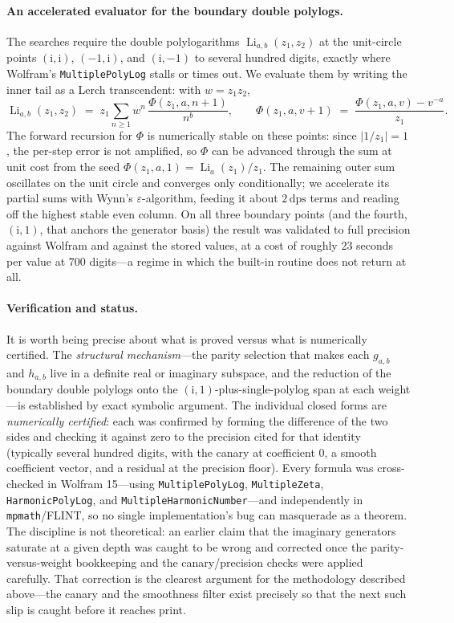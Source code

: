 \documentclass[11pt]{article}
\DeclareMathOperator{\Li}{Li}
\newcommand{\iu}{\mathrm{i}}
\theoremstyle{plain}
\theoremstyle{remark}
\begin{document}
\paragraph{An accelerated evaluator for the boundary double polylogs.}
The searches require the double polylogarithms $\Li_{a,b}(z_1,z_2)$ at the unit-circle points $(\iu,\iu)$, $(-1,\iu)$, and $(\iu,-1)$ to several hundred digits, exactly where Wolfram's \texttt{MultiplePolyLog} stalls or times out. We evaluate them by writing the inner tail as a Lerch transcendent: with $w=z_1 z_2$,
\[
  \Li_{a,b}(z_1,z_2) \;=\; z_1 \sum_{n\ge 1} w^{n}\,\frac{\Phi(z_1,a,n+1)}{n^{b}},
\qquad
  \Phi(z_1,a,v+1) \;=\; \frac{\Phi(z_1,a,v) - v^{-a}}{z_1}.
\]
The forward recursion for $\Phi$ is numerically stable on these points: since $|1/z_1| = 1$, the per-step error is not amplified, so $\Phi$ can be advanced through the sum at unit cost from the seed $\Phi(z_1,a,1)=\Li_a(z_1)/z_1$. The remaining outer sum oscillates on the unit circle and converges only conditionally; we accelerate its partial sums with Wynn's $\varepsilon$-algorithm, feeding it about $2\,\text{dps}$ terms and reading off the highest stable even column. On all three boundary points (and the fourth, $(\iu,1)$, that anchors the generator basis) the result was validated to full precision against Wolfram and against the stored values, at a cost of roughly $23$ seconds per value at $700$ digits---a regime in which the built-in routine does not return at all.

\paragraph{Verification and status.}
It is worth being precise about what is proved versus what is numerically certified. The \emph{structural mechanism}---the parity selection that makes each $g_{a,b}$ and $h_{a,b}$ live in a definite real or imaginary subspace, and the reduction of the boundary double polylogs onto the $(\iu,1)$-plus-single-polylog span at each weight---is established by exact symbolic argument. The individual closed forms are \emph{numerically certified}: each was confirmed by forming the difference of the two sides and checking it against zero to the precision cited for that identity (typically several hundred digits, with the canary at coefficient $0$, a smooth coefficient vector, and a residual at the precision floor). Every formula was cross-checked in Wolfram 15---using \texttt{MultiplePolyLog}, \texttt{MultipleZeta}, \texttt{HarmonicPolyLog}, and \texttt{MultipleHarmonicNumber}---and independently in \texttt{mpmath}/FLINT, so no single implementation's bug can masquerade as a theorem. The discipline is not theoretical: an earlier claim that the imaginary generators saturate at a given depth was caught to be wrong and corrected once the parity-versus-weight bookkeeping and the canary/precision checks were applied carefully. That correction is the clearest argument for the methodology described above---the canary and the smoothness filter exist precisely so that the next such slip is caught before it reaches print.
\end{document}
